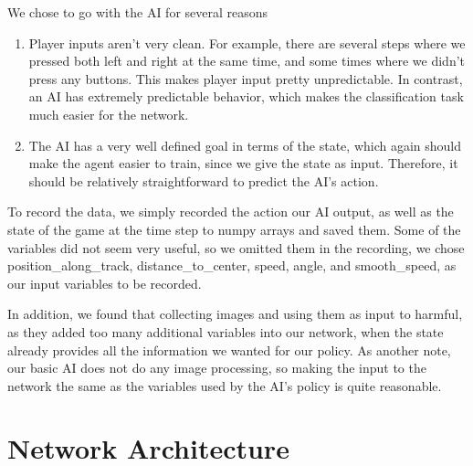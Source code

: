 \documentclass[psamsfonts]{amsart}
\theoremstyle{definition}
\theoremstyle{remark}
\begin{document}
 We chose to go with the AI for several reasons
\begin{enumerate}
\item Player inputs aren't very clean. For example, there are several steps where we pressed both left and right at the same time, and some times where we didn't press any buttons. This makes player input pretty unpredictable. In contrast, an AI has extremely predictable behavior, which makes the classification task much easier for the network.
\item The AI has a very well defined goal in terms of the state, which again should make the agent easier to train, since we give the state as input. Therefore, it should be relatively straightforward to predict the AI's action.
\end{enumerate}

To record the data, we simply recorded the action our AI output, as well as the state of the game at the time step to numpy arrays and saved them. Some of the variables did not seem very useful, so we omitted them in the recording, we chose position\_along\_track, distance\_to\_center, speed, angle, and smooth\_speed,  as our input variables to be recorded. 

In addition, we found that collecting images and using them as input to harmful, as they added too many additional variables into our network, when the state already provides all the information we wanted for our policy. As another note, our basic AI does not do any image processing, so making the input to the network the same as the variables used by the AI's policy is quite reasonable.

\section*{Network Architecture}
\end{document}
